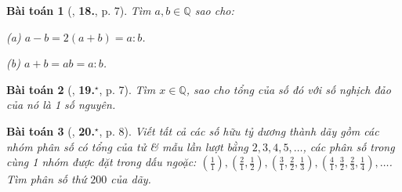 \documentclass{article}
\numberwithin{equation}{section}
\newtheorem{baitoan}{Bài toán}[section]
\begin{document}
\begin{baitoan}[\cite{Binh_Toan_7_tap_1}, \textbf{18.}, p. 7]
	Tìm $a,b\in\mathbb{Q}$ sao cho:
	\begin{enumerate*}
		\item[(a)] $a - b = 2(a + b) = a:b$.
		\item[(b)] $a + b = ab = a:b$.
	\end{enumerate*}
\end{baitoan}

\begin{baitoan}[\cite{Binh_Toan_7_tap_1}, \textbf{19.}${}^\star$, p. 7]
	Tìm $x\in\mathbb{Q}$, sao cho tổng của số đó với số nghịch đảo của nó là 1 số nguyên.
\end{baitoan}

\begin{baitoan}[\cite{Binh_Toan_7_tap_1}, \textbf{20.}${}^\star$, p. 8]
	Viết tất cả các số hữu tỷ dương  thành dãy gồm các nhóm phân số có tổng của tử \& mẫu lần lượt bằng $2,3,4,5,\ldots$, các phân số trong cùng 1 nhóm được đặt trong dấu ngoặc: $\left(\frac{1}{1}\right),\left(\frac{2}{1},\frac{1}{2}\right),\left(\frac{3}{1},\frac{2}{2},\frac{1}{3}\right),\left(\frac{4}{1},\frac{3}{2},\frac{2}{3},\frac{1}{4}\right),\ldots$. Tìm phân số thứ $200$ của dãy.
\end{baitoan}

\end{document}
